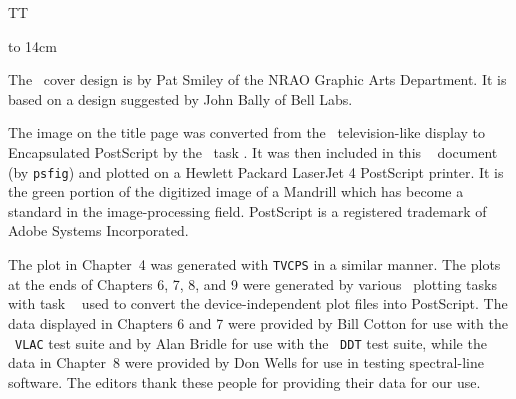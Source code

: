 

\def\doFIG{T}
\def\titlea{15-Oct-1998 and earlier}

\cbegint
\if T\doFIG
   \centerline{\hss{}\hss}
\vfill
\else
   \vbox to 14cm{\vfill\omit\vfill}
\fi
\cbeginb
\def\tpage{T}
\vskip 20pt

     The \COOKBOOK\ cover design is by Pat Smiley of the NRAO Graphic
Arts Department.  It is based on a design suggested by John Bally of
Bell Labs.

     The image on the title page was converted from the \AIPS\
television-like display to Encapsulated PostScript by the \AIPS\ task
\hbox{{\tt \tndx{TVCPS}}}.  It was then included in this \TEX\
 document (by {\tt psfig}) and plotted on a Hewlett Packard
LaserJet 4 PostScript printer.  It is the green portion of the
digitized image of a Mandrill which has become a standard in the
image-processing field.  PostScript is a registered trademark of Adobe
Systems Incorporated.

     The plot in Chapter~4 was generated with {\tt TVCPS} in a similar
manner.  The plots at the ends of Chapters 6, 7, 8, and 9 were
generated by various \AIPS\ plotting tasks with task {\tt
\tndx{LWPLA}} used to convert the device-independent plot files into
PostScript.  The data displayed in Chapters 6 and 7 were provided by
Bill Cotton for use with the \AIPS\ {\tt VLAC} test suite and by Alan
Bridle for use with the \AIPS\ {\tt DDT} test suite, while the data in
Chapter~8 were provided by Don Wells for use in testing spectral-line
software.  The editors thank these people for providing their data for
our use.

